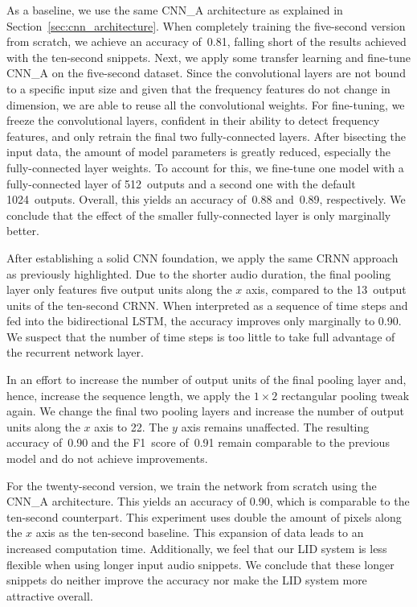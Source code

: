 As a baseline, we use the same CNN\_A architecture as explained in Section~\ref{sec:cnn_architecture}. When completely training the five-second version from scratch, we achieve an accuracy of~\num{0.81}, falling short of the results achieved with the ten-second snippets. Next, we apply some transfer learning and fine-tune CNN\_A on the five-second dataset. Since the convolutional layers are not bound to a specific input size and given that the frequency features do not change in dimension, we are able to reuse all the convolutional weights. For fine-tuning, we freeze the convolutional layers, confident in their ability to detect frequency features, and only retrain the final two fully-connected layers. After bisecting the input data, the amount of model parameters is greatly reduced, especially the fully-connected layer weights. To account for this, we fine-tune one model with a fully-connected layer of \num{512}~outputs and a second one with the default \num{1024}~outputs. Overall, this yields an accuracy of~\num{0.88} and~\num{0.89}, respectively. We conclude that the effect of the smaller fully-connected layer is only marginally better.

After establishing a solid CNN foundation, we apply the same CRNN approach as previously highlighted. Due to the shorter audio duration, the final pooling layer only features five output units along the $x$ axis, compared to the \num{13}~output units of the ten-second CRNN. When interpreted as a sequence of time steps and fed into the bidirectional LSTM, the accuracy improves only marginally to \num{0.90}. We suspect that the number of time steps is too little to take full advantage of the recurrent network layer.

In an effort to increase the number of output units of the final pooling layer and, hence, increase the sequence length, we apply the $1 \times 2$ rectangular pooling tweak again. We change the final two pooling layers and increase the number of output units along the $x$ axis to \num{22}. The $y$ axis remains unaffected. The resulting accuracy of~\num{0.90} and the F1~score of~\num{0.91} remain comparable to the previous model and do not achieve improvements.

For the twenty-second version, we train the network from scratch using the CNN\_A architecture. This yields an accuracy of \num{0.90}, which is comparable to the ten-second counterpart. This experiment uses double the amount of pixels along the $x$ axis as the ten-second baseline. This expansion of data leads to an increased computation time. Additionally, we feel that our LID system is less flexible when using longer input audio snippets. We conclude that these longer snippets do neither improve the accuracy nor make the LID system more attractive overall.

